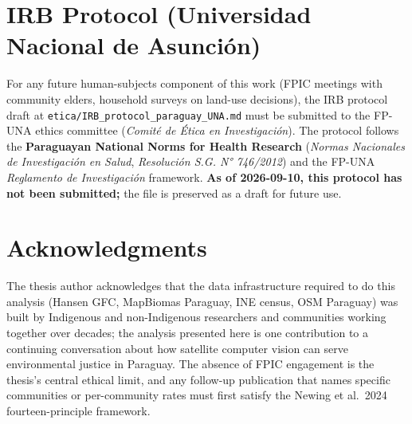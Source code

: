 \section{IRB Protocol (Universidad Nacional de Asunción)}

For any future human-subjects component of this work (FPIC
meetings with community elders, household surveys on land-use
decisions), the IRB protocol draft at
\texttt{etica/IRB\_protocol\_paraguay\_UNA.md} must be submitted
to the FP-UNA ethics committee (\emph{Comité de Ética en
Investigación}). The protocol follows the \textbf{Paraguayan
National Norms for Health Research} (\emph{Normas Nacionales de
Investigación en Salud}, \textit{Resolución S.G. N° 746/2012})
and the FP-UNA \textit{Reglamento de Investigación} framework.
\textbf{As of 2026-09-10, this protocol has not been submitted;}
the file is preserved as a draft for future use.

\section{Acknowledgments}

The thesis author acknowledges that the data infrastructure
required to do this analysis (Hansen GFC, MapBiomas Paraguay,
INE census, OSM Paraguay) was built by Indigenous and
non-Indigenous researchers and communities working together over
decades; the analysis presented here is one contribution to a
continuing conversation about how satellite computer vision can
serve environmental justice in Paraguay. The absence of FPIC
engagement is the thesis's central ethical limit, and any
follow-up publication that names specific communities or
per-community rates must first satisfy the Newing et al.\ 2024
fourteen-principle framework.
